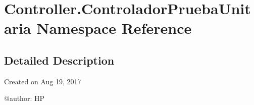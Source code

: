 \hypertarget{namespace_controller_1_1_controlador_prueba_unitaria}{}\section{Controller.\+Controlador\+Prueba\+Unitaria Namespace Reference}
\label{namespace_controller_1_1_controlador_prueba_unitaria}


\subsection{Detailed Description}
\begin{DoxyVerb}Created on Aug 19, 2017

@author: HP
\end{DoxyVerb}
 